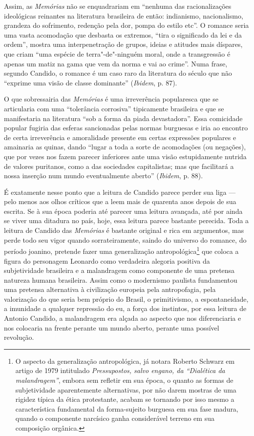 Assim, as \emph{Memórias} não se enquadrariam em ``nenhuma das
racionalizações ideológicas reinantes na literatura brasileira de então:
indianismo, nacionalismo, grandeza do sofrimento, redenção pela dor,
pompa do estilo etc''. O romance seria uma vasta acomodação que desbasta
os extremos, ``tira o significado da lei e da ordem'', mostra uma
interpenetração de grupos, ideias e atitudes mais díspares, que criam
``uma espécie de terra"-de"-ninguém moral, onde a transgressão é apenas um
matiz na gama que vem da norma e vai ao crime''. Numa frase, segundo
Candido, o romance é um caso raro da literatura do século  que não
``exprime uma visão de classe dominante'' (\emph{Ibidem}, p. 87).

O que sobressairia das \emph{Memórias} é uma irreverência popularesca
que se articularia com uma ``tolerância corrosiva'' tipicamente
brasileira e que se manifestaria na literatura ``sob a forma da piada
devastadora''. Essa comicidade popular fugiria das esferas sancionadas
pelas normas burguesas e iria ao encontro de certa irreverência e
amoralidade presente em certas expressões populares e amainaria as
quinas, dando ``lugar a toda a sorte de acomodações (ou negações), que
por vezes nos fazem parecer inferiores ante uma visão estupidamente
nutrida de valores puritanos, como a das sociedades capitalistas; mas
que facilitará a nossa inserção num mundo eventualmente aberto''
(\emph{Ibidem}, p. 88).

É exatamente nesse ponto que a leitura de Candido parece perder sua liga
--- pelo menos aos olhos críticos que a leem mais de quarenta anos depois
de sua escrita. Se à sua época poderia até parecer uma leitura avançada,
até por ainda se viver uma ditadura no país, hoje, essa leitura parece
bastante perecida. Toda a leitura de Candido das \emph{Memórias} é
bastante original e rica em argumentos, mas perde todo seu vigor quando
sorrateiramente, saindo do universo do romance, do período joanino,
pretende fazer uma generalização antropológica\footnote{O aspecto da
  generalização antropológica, já notara Roberto Schwarz em artigo de
  1979 intitulado \emph{Pressupostos, salvo engano, da ``Dialética da
  malandragem''}, embora sem refletir em sua época, o quanto as formas
  de subjetividade aparentemente alternativas, por não darem mostras de
  uma rigidez típica da ética protestante,  acabam se tornando por isso
  mesmo a característica fundamental da forma-sujeito burguesa em sua
  fase madura, quando o componente narcísico ganha considerável terreno em
  sua composição orgânica.} que coloca a figura do personagem Leonardo
como verdadeira alegoria positiva da subjetividade brasileira e a
malandragem como componente de uma pretensa natureza humana brasileira.
Assim como o modernismo paulista fundamentou uma pretensa alternativa à
civilização europeia pela antropofagia, pela valorização do que seria
bem próprio do Brasil, o primitivismo, a espontaneidade, a imunidade a
qualquer repressão do eu, a força dos instintos, por essa leitura de
Antonio Candido, a malandragem era alçada ao aspecto que nos
diferenciaria e nos colocaria na frente perante um mundo aberto, perante
uma possível revolução.

